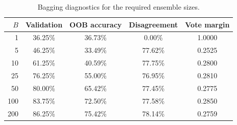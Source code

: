 \begin{table}[t]
\centering
\small
\caption{Bagging diagnostics for the required ensemble sizes.}
\label{tab:bagging_diagnostics}
\begin{tabular}{rcccc}
\hline
$B$ & Validation & OOB accuracy & Disagreement & Vote margin \\
\hline
1 & 36.25\% & 36.73\% & 0.00\% & 1.0000 \\
5 & 46.25\% & 33.49\% & 77.62\% & 0.2525 \\
10 & 61.25\% & 40.59\% & 77.75\% & 0.2800 \\
25 & 76.25\% & 55.00\% & 76.95\% & 0.2810 \\
50 & 80.00\% & 65.42\% & 77.45\% & 0.2775 \\
100 & 83.75\% & 72.50\% & 77.58\% & 0.2850 \\
200 & 86.25\% & 75.42\% & 78.14\% & 0.2759 \\
\hline
\end{tabular}
\end{table}
